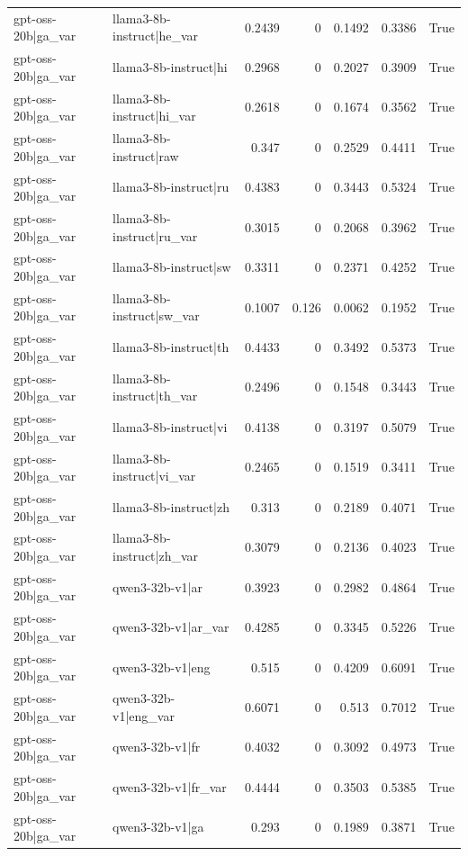\begin{table}
\begin{tabular}{l l r r r r l}
gpt-oss-20b|ga_var & llama3-8b-instruct|he_var & 0.2439 & 0 & 0.1492 & 0.3386 & True \\
gpt-oss-20b|ga_var & llama3-8b-instruct|hi & 0.2968 & 0 & 0.2027 & 0.3909 & True \\
gpt-oss-20b|ga_var & llama3-8b-instruct|hi_var & 0.2618 & 0 & 0.1674 & 0.3562 & True \\
gpt-oss-20b|ga_var & llama3-8b-instruct|raw & 0.347 & 0 & 0.2529 & 0.4411 & True \\
gpt-oss-20b|ga_var & llama3-8b-instruct|ru & 0.4383 & 0 & 0.3443 & 0.5324 & True \\
gpt-oss-20b|ga_var & llama3-8b-instruct|ru_var & 0.3015 & 0 & 0.2068 & 0.3962 & True \\
gpt-oss-20b|ga_var & llama3-8b-instruct|sw & 0.3311 & 0 & 0.2371 & 0.4252 & True \\
gpt-oss-20b|ga_var & llama3-8b-instruct|sw_var & 0.1007 & 0.126 & 0.0062 & 0.1952 & True \\
gpt-oss-20b|ga_var & llama3-8b-instruct|th & 0.4433 & 0 & 0.3492 & 0.5373 & True \\
gpt-oss-20b|ga_var & llama3-8b-instruct|th_var & 0.2496 & 0 & 0.1548 & 0.3443 & True \\
gpt-oss-20b|ga_var & llama3-8b-instruct|vi & 0.4138 & 0 & 0.3197 & 0.5079 & True \\
gpt-oss-20b|ga_var & llama3-8b-instruct|vi_var & 0.2465 & 0 & 0.1519 & 0.3411 & True \\
gpt-oss-20b|ga_var & llama3-8b-instruct|zh & 0.313 & 0 & 0.2189 & 0.4071 & True \\
gpt-oss-20b|ga_var & llama3-8b-instruct|zh_var & 0.3079 & 0 & 0.2136 & 0.4023 & True \\
gpt-oss-20b|ga_var & qwen3-32b-v1|ar & 0.3923 & 0 & 0.2982 & 0.4864 & True \\
gpt-oss-20b|ga_var & qwen3-32b-v1|ar_var & 0.4285 & 0 & 0.3345 & 0.5226 & True \\
gpt-oss-20b|ga_var & qwen3-32b-v1|eng & 0.515 & 0 & 0.4209 & 0.6091 & True \\
gpt-oss-20b|ga_var & qwen3-32b-v1|eng_var & 0.6071 & 0 & 0.513 & 0.7012 & True \\
gpt-oss-20b|ga_var & qwen3-32b-v1|fr & 0.4032 & 0 & 0.3092 & 0.4973 & True \\
gpt-oss-20b|ga_var & qwen3-32b-v1|fr_var & 0.4444 & 0 & 0.3503 & 0.5385 & True \\
gpt-oss-20b|ga_var & qwen3-32b-v1|ga & 0.293 & 0 & 0.1989 & 0.3871 & True \\

\end{tabular}
\end{table}

